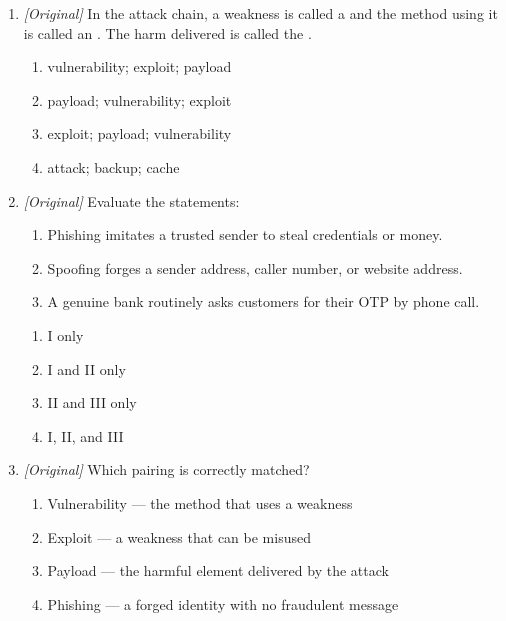 \documentclass[11pt]{article}
\begin{document}
\begin{enumerate}[label=\textbf{Q\arabic*.}, leftmargin=*]
\begin{enumerate}[label=\Alph*.]
    \item Open it at once and enable macros if asked
    \item Confirm with the sender through a separate channel before opening
    \item Forward it to all contacts
    \item Delete the antivirus so the file opens faster
  \end{enumerate}
\item \textit{[Original]} In the attack chain, a weakness is called a
  \underline{\hspace{2.2cm}} and the method using it is called an
  \underline{\hspace{2.2cm}}. The harm delivered is called the
  \underline{\hspace{2.2cm}}.
  \begin{enumerate}[label=\Alph*.]
    \item vulnerability; exploit; payload
    \item payload; vulnerability; exploit
    \item exploit; payload; vulnerability
    \item attack; backup; cache
  \end{enumerate}
\item \textit{[Original]} Evaluate the statements:
  \begin{enumerate}[label=\Roman*.]
    \item Phishing imitates a trusted sender to steal credentials or money.
    \item Spoofing forges a sender address, caller number, or website address.
    \item A genuine bank routinely asks customers for their OTP by phone call.
  \end{enumerate}
  \begin{enumerate}[label=\Alph*.]
    \item I only
    \item I and II only
    \item II and III only
    \item I, II, and III
  \end{enumerate}
\item \textit{[Original]} Which pairing is correctly matched?
  \begin{enumerate}[label=\Alph*.]
    \item Vulnerability --- the method that uses a weakness
    \item Exploit --- a weakness that can be misused
    \item Payload --- the harmful element delivered by the attack
    \item Phishing --- a forged identity with no fraudulent message
  \end{enumerate}


\end{enumerate}
\end{document}

